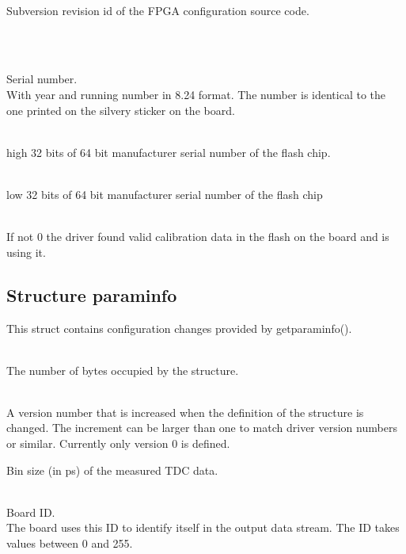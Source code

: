 			\\
			Subversion revision id of the FPGA configuration source code.

			\\
			\par

			\\
			Serial number.\\
			With year and running number in 8.24 format. The number is identical to the one printed on the silvery sticker on the board.\par

			\\
			high 32 bits of 64 bit manufacturer serial number of the flash chip.

			\\
			low 32 bits of 64 bit manufacturer serial number of the flash chip

			\\
			If not 0 the driver found valid calibration data in the flash on the board and is using it.\par

		\subsection{Structure \prefix param\tu info}
			This struct contains configuration changes provided by \textsf{\prefix get\tu param\tu info()}.

			\\
			The number of bytes occupied by the structure. \par

			\\
			A version number that is increased when the definition of the structure is changed. The increment can be larger than one to match driver version numbers or similar. Currently only version 0 is defined.\par


			Bin size (in ps) of the measured TDC data.

			\\
			Board ID.\\
			The board uses this ID to identify itself in the output data stream. The ID takes values between 0 and 255.\par

